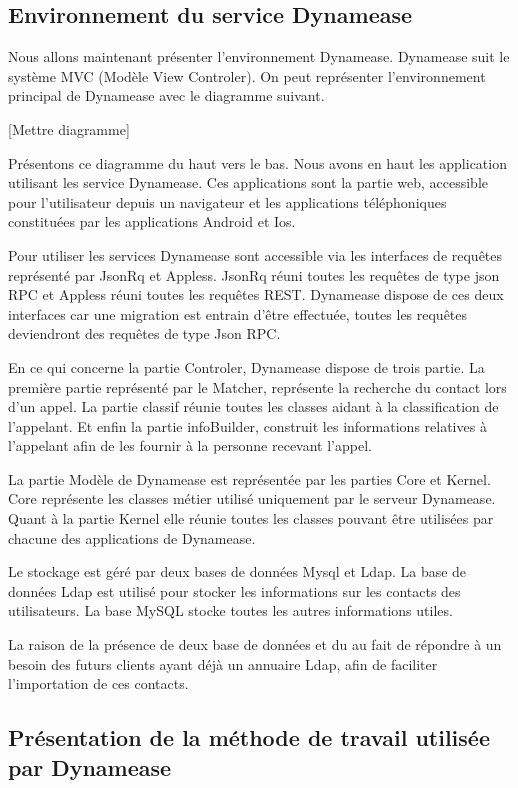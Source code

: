 \subsection{Environnement du service Dynamease}

Nous allons maintenant présenter l'environnement Dynamease. Dynamease suit le système MVC (Modèle View Controler). On peut représenter l'environnement principal de Dynamease avec le diagramme suivant.

[Mettre diagramme]

Présentons ce diagramme du haut vers le bas. Nous avons en haut les application utilisant les service Dynamease. Ces applications sont la partie web, accessible pour l'utilisateur depuis un navigateur et les applications téléphoniques constituées par les applications Android et Ios.

Pour utiliser les services Dynamease sont accessible via les interfaces de requêtes représenté par JsonRq et Appless. JsonRq réuni toutes les requêtes de type json RPC et Appless réuni toutes les requêtes REST. Dynamease dispose de ces deux interfaces car une migration est entrain d'être effectuée, toutes les requêtes deviendront des requêtes de type Json RPC.

En ce qui concerne la partie Controler, Dynamease dispose de trois partie. La première partie représenté par le Matcher, représente la recherche du contact lors d'un appel. La partie classif réunie toutes les classes aidant à la classification de l'appelant. Et enfin la partie infoBuilder, construit les informations relatives à l'appelant afin de les fournir à la personne recevant l'appel.

La partie Modèle de Dynamease est représentée par les parties Core et Kernel. Core représente les classes métier utilisé uniquement par le serveur Dynamease. Quant à la partie Kernel elle réunie toutes les classes pouvant être utilisées par chacune des applications de Dynamease.

Le stockage est géré par deux bases de données Mysql et Ldap. La base de données Ldap est utilisé pour stocker les informations sur les contacts des utilisateurs. La base MySQL stocke toutes les autres informations utiles.

La raison de la présence de deux base de données et du au fait de répondre à un besoin des futurs clients ayant déjà un annuaire Ldap, afin de faciliter l'importation de ces contacts.

\subsection{Présentation de la méthode de travail utilisée par Dynamease}